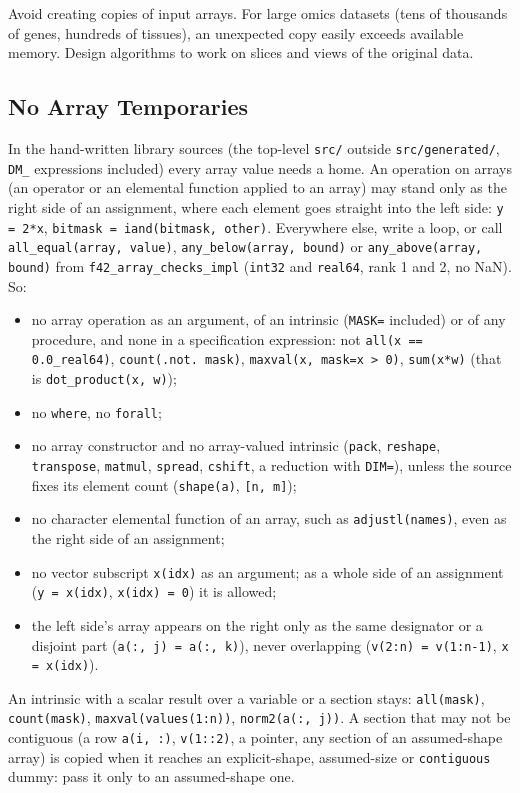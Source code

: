 \documentclass{article}
\begin{document}
Avoid creating copies of input arrays. For large omics datasets (tens of thousands of genes, hundreds of tissues), an unexpected copy easily exceeds available memory. Design algorithms to work on slices and views of the original data.

\subsection{No Array Temporaries}\label{sec:no-array-temporaries}

In the hand-written library sources (the top-level \texttt{src/} outside \texttt{src/generated/},
\texttt{DM\_} expressions included) every array value needs a home. An operation on arrays (an
operator or an elemental function applied to an array) may stand only as the right side of an
assignment, where each element goes straight into the left side: \texttt{y = 2*x},
\texttt{bitmask = iand(bitmask, other)}. Everywhere else, write a loop, or call
\texttt{all\_equal(array, value)}, \texttt{any\_below(array, bound)} or \texttt{any\_above(array, bound)}
from \texttt{f42\_array\_checks\_impl} (\texttt{int32} and \texttt{real64}, rank 1 and 2, no NaN). So:
\begin{itemize}
  \item no array operation as an argument, of an intrinsic (\texttt{MASK=} included) or of any procedure,
        and none in a specification expression: not \texttt{all(x == 0.0\_real64)},
        \texttt{count(.not. mask)}, \texttt{maxval(x, mask=x > 0)}, \texttt{sum(x*w)} (that is
        \texttt{dot\_product(x, w)});
  \item no \texttt{where}, no \texttt{forall};
  \item no array constructor and no array-valued intrinsic (\texttt{pack}, \texttt{reshape},
        \texttt{transpose}, \texttt{matmul}, \texttt{spread}, \texttt{cshift}, a reduction with
        \texttt{DIM=}), unless the source fixes its element count (\texttt{shape(a)}, \texttt{[n, m]});
  \item no character elemental function of an array, such as \texttt{adjustl(names)}, even as the
        right side of an assignment;
  \item no vector subscript \texttt{x(idx)} as an argument; as a whole side of an assignment
        (\texttt{y = x(idx)}, \texttt{x(idx) = 0}) it is allowed;
  \item the left side's array appears on the right only as the same designator or a disjoint part
        (\texttt{a(:, j) = a(:, k)}), never overlapping (\texttt{v(2:n) = v(1:n-1)}, \texttt{x = x(idx)}).
\end{itemize}
\begin{sloppypar}
An intrinsic with a scalar result over a variable or a section stays: \texttt{all(mask)},
\texttt{count(mask)}, \texttt{maxval(values(1:n))}, \texttt{norm2(a(:, j))}. A section that may not be
contiguous (a row \texttt{a(i, :)}, \texttt{v(1::2)}, a pointer, any section of an assumed-shape array)
is copied when it reaches an explicit-shape, assumed-size or \texttt{contiguous} dummy: pass it only to
an assumed-shape one.
\end{sloppypar}
\end{document}
